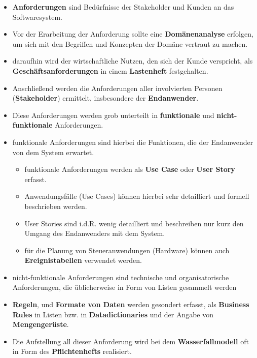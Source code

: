 \begin{itemize}
    \item \textbf{Anforderungen} sind Bedürfnisse der Stakeholder und Kunden an das Softwaresystem.
    \item Vor der Erarbeitung der Anforderung sollte eine \textbf{Domänenanalyse} erfolgen, um sich mit den Begriffen und Konzepten der Domäne vertraut zu machen.
    \item daraufhin wird der wirtschaftliche Nutzen, den sich der Kunde verspricht, als \textbf{Geschäftsanforderungen} in einem \textbf{Lastenheft} festgehalten.
    \item Anschließend werden die Anforderungen aller involvierten Personen (\textbf{Stakeholder}) ermittelt, insbesondere der \textbf{Endanwender}.
    \item Diese Anforderungen werden grob unterteilt in \textbf{funktionale} und \textbf{nicht-funktionale} Anforderungen.
    \item funktionale Anforderungen sind hierbei die Funktionen, die der Endanwender von dem System erwartet.
    \begin{itemize}
        \item funktionale Anforderungen werden als \textbf{Use Case} oder \textbf{User Story} erfasst.
        \item Anwendungsfälle (Use Cases) können hierbei sehr detailliert und formell beschrieben werden.
        \item User Stories sind i.d.R. wenig detailliert und beschreiben nur kurz den Umgang des Endanwenders mit dem System.
        \item für die Planung von Steueranwendungen (Hardware) können auch \textbf{Ereignistabellen} verwendet werden.
    \end{itemize}
    \item nicht-funktionale Anforderungen sind technische und organisatorische Anforderungen, die üblicherweise in Form von Listen gesammelt werden
    \item \textbf{Regeln}, und \textbf{Formate von Daten} werden gesondert erfasst, als \textbf{Business Rules} in Listen bzw. in \textbf{Datadictionaries} und der Angabe von \textbf{Mengengerüste}.
    \item Die Aufstellung all dieser Anforderung wird bei dem \textbf{Wasserfallmodell} oft in Form des \textbf{Pflichtenhefts} realisiert.
\end{itemize}
